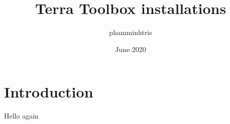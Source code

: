 \documentclass{article}
\title{Terra Toolbox installations}
\author{phamminhtris }
\date{June 2020}
\begin{document}
\maketitle

\section{Introduction}
Hello again
\end{document}
